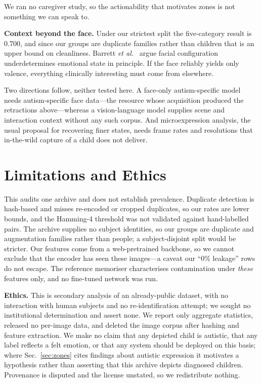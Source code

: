 \documentclass[conference,10pt]{IEEEtran}
\begin{document}
We ran no caregiver study, so the actionability that motivates zones is not
something we can speak to.

\textbf{Context beyond the face.} Under our strictest split the five-category
result is 0.700, and since our groups are duplicate families rather than
children that is an upper bound on cleanliness. Barrett \emph{et
al.}~\cite{barrett2019} argue facial configuration underdetermines emotional
state in principle. If the face reliably yields only valence, everything
clinically interesting must come from elsewhere.

Two directions follow, neither tested here. A face-only autism-specific model
needs autism-specific face data---the resource whose acquisition produced the
retractions above---whereas a vision-language model supplies scene and
interaction context without any such corpus. And microexpression analysis, the
usual proposal for recovering finer states, needs frame rates and resolutions
that in-the-wild capture of a child does not deliver.

\section{Limitations and Ethics}
This audits one archive and does not establish prevalence. Duplicate detection is
hash-based and misses re-encoded or cropped duplicates, so our rates are lower
bounds, and the Hamming-4 threshold was not validated against hand-labelled
pairs. The archive supplies no subject identities, so our groups are duplicate
and augmentation families rather than people; a subject-disjoint split would be
stricter. Our features come from a web-pretrained backbone, so we cannot exclude
that the encoder has seen these images---a caveat our ``0\% leakage'' rows do
not escape. The reference memoriser characterises contamination under
\emph{these} features only, and no fine-tuned network was run.

\textbf{Ethics.} This is secondary analysis of an already-public dataset, with no
interaction with human subjects and no re-identification attempt; we sought no
institutional determination and assert none. We report only aggregate
statistics, released no per-image data, and deleted the image corpus after
hashing and feature extraction. We make no claim that any depicted child is
autistic, that any label reflects a felt emotion, or that any system should be
deployed on this basis; where Sec.~\ref{sec:zones} cites findings about autistic
expression it motivates a hypothesis rather than asserting that this archive
depicts diagnosed children. Provenance is disputed and the license unstated, so
we redistribute nothing.
\end{document}
